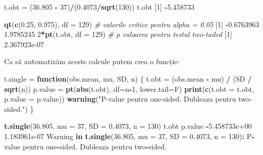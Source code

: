 \documentclass[]{article}
\newenvironment{Shaded}{\begin{snugshade}}{\end{snugshade}}
\newcommand{\KeywordTok}[1]{\textcolor[rgb]{0.13,0.29,0.53}{\textbf{#1}}}
\newcommand{\DataTypeTok}[1]{\textcolor[rgb]{0.13,0.29,0.53}{#1}}
\newcommand{\DecValTok}[1]{\textcolor[rgb]{0.00,0.00,0.81}{#1}}
\newcommand{\FloatTok}[1]{\textcolor[rgb]{0.00,0.00,0.81}{#1}}
\newcommand{\StringTok}[1]{\textcolor[rgb]{0.31,0.60,0.02}{#1}}
\newcommand{\CommentTok}[1]{\textcolor[rgb]{0.56,0.35,0.01}{\textit{#1}}}
\newcommand{\ControlFlowTok}[1]{\textcolor[rgb]{0.13,0.29,0.53}{\textbf{#1}}}
\newcommand{\OperatorTok}[1]{\textcolor[rgb]{0.81,0.36,0.00}{\textbf{#1}}}
\newcommand{\NormalTok}[1]{#1}
\begin{document}
\begin{Shaded}
\begin{Highlighting}[]
\NormalTok{t.obt =}\StringTok{ }\NormalTok{(}\FloatTok{36.805} \OperatorTok{-}\StringTok{ }\DecValTok{37}\NormalTok{)}\OperatorTok{/}\NormalTok{(}\FloatTok{0.4073}\OperatorTok{/}\KeywordTok{sqrt}\NormalTok{(}\DecValTok{130}\NormalTok{))}
\NormalTok{t.obt}
\NormalTok{[}\DecValTok{1}\NormalTok{] }\OperatorTok{-}\FloatTok{5.458733}

\KeywordTok{qt}\NormalTok{(}\KeywordTok{c}\NormalTok{(}\FloatTok{0.25}\NormalTok{, }\FloatTok{0.975}\NormalTok{), }\DataTypeTok{df =} \DecValTok{129}\NormalTok{) }\CommentTok{# valorile critice pentru alpha = 0.05}
\NormalTok{[}\DecValTok{1}\NormalTok{] }\OperatorTok{-}\FloatTok{0.6763963}  \FloatTok{1.9785245}
\DecValTok{2}\OperatorTok{*}\KeywordTok{pt}\NormalTok{(t.obt, }\DataTypeTok{df =} \DecValTok{129}\NormalTok{) }\CommentTok{# p valoarea pentru testul two-tailed}
\NormalTok{[}\DecValTok{1}\NormalTok{] }\FloatTok{2.367923e-07}
\end{Highlighting}
\end{Shaded}

Ca să automatizăm aceste calcule putem crea o funcție:

\begin{Shaded}
\begin{Highlighting}[]
\NormalTok{t.single =}\StringTok{ }\ControlFlowTok{function}\NormalTok{(obs.mean, mu, SD, n) \{}
\NormalTok{  t.obt =}\StringTok{ }\NormalTok{(obs.mean }\OperatorTok{-}\StringTok{ }\NormalTok{mu) }\OperatorTok{/}\StringTok{ }\NormalTok{(SD }\OperatorTok{/}\StringTok{ }\KeywordTok{sqrt}\NormalTok{(n))}
\NormalTok{  p.value =}\StringTok{ }\KeywordTok{pt}\NormalTok{(}\KeywordTok{abs}\NormalTok{(t.obt), }\DataTypeTok{df=}\NormalTok{n}\OperatorTok{-}\DecValTok{1}\NormalTok{, }\DataTypeTok{lower.tail=}\NormalTok{F)}
  \KeywordTok{print}\NormalTok{(}\KeywordTok{c}\NormalTok{(}\DataTypeTok{t.obt =}\NormalTok{ t.obt, }\DataTypeTok{p.value =}\NormalTok{ p.value))}
  \KeywordTok{warning}\NormalTok{(}\StringTok{"P-value pentru one-sided. Dubleaza pentru two-sided."}\NormalTok{)}
\NormalTok{\}}

\KeywordTok{t.single}\NormalTok{(}\FloatTok{36.805}\NormalTok{, }\DataTypeTok{mu =} \DecValTok{37}\NormalTok{, }\DataTypeTok{SD =} \FloatTok{0.4073}\NormalTok{, }\DataTypeTok{n =} \DecValTok{130}\NormalTok{)}
\NormalTok{        t.obt       p.value }
\OperatorTok{-}\FloatTok{5.458733e+00}  \FloatTok{1.183961e-07} 
\NormalTok{Warning }\ControlFlowTok{in} \KeywordTok{t.single}\NormalTok{(}\FloatTok{36.805}\NormalTok{, }\DataTypeTok{mu =} \DecValTok{37}\NormalTok{, }\DataTypeTok{SD =} \FloatTok{0.4073}\NormalTok{, }\DataTypeTok{n =} \DecValTok{130}\NormalTok{)}\OperatorTok{:}\StringTok{ }\NormalTok{P}\OperatorTok{-}\NormalTok{value pentru}
\NormalTok{one}\OperatorTok{-}\NormalTok{sided. Dubleaza pentru two}\OperatorTok{-}\NormalTok{sided.}
\end{Highlighting}
\end{Shaded}
\end{document}
